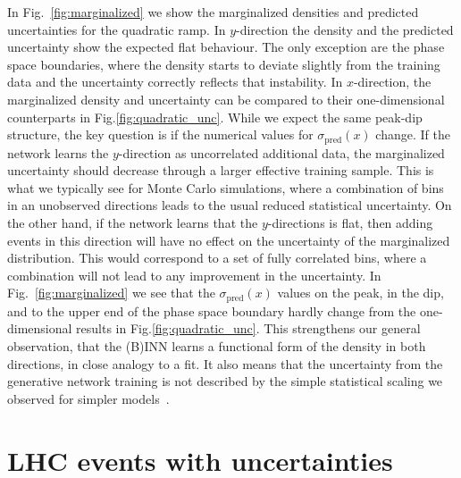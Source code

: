 In Fig.~\ref{fig:marginalized} we show the marginalized densities and
predicted uncertainties for the quadratic ramp.  In $y$-direction the
density and the predicted uncertainty show the expected flat
behaviour. The only exception are the phase space boundaries, where the
density starts to deviate slightly from the training data and the
uncertainty correctly reflects that instability.  In $x$-direction,
the marginalized density and uncertainty can be compared to their
one-dimensional counterparts in Fig.\ref{fig:quadratic_unc}. While we
expect the same peak-dip structure, the key question is if the
numerical values for $\sigma_\text{pred}(x)$ change. If the network
learns the $y$-direction as uncorrelated additional data, the
marginalized uncertainty should decrease through a larger effective
training sample. This is what we typically see for Monte Carlo
simulations, where a combination of bins in an unobserved directions
leads to the usual reduced statistical uncertainty. On the other hand,
if the network learns that the $y$-directions is flat, then adding
events in this direction will have no effect on the uncertainty of the
marginalized distribution. This would correspond to a set of fully
correlated bins, where a combination will not lead to any improvement
in the uncertainty. In Fig.~\ref{fig:marginalized} we see that the
$\sigma_\text{pred}(x)$ values on the peak, in the dip, and to the
upper end of the phase space boundary hardly change from the
one-dimensional results in Fig.\ref{fig:quadratic_unc}. This strengthens
our general observation, that the (B)INN learns a functional form of
the density in both directions, in close analogy to a fit. It also
means that the uncertainty from the generative network training is not
described by the simple statistical scaling we observed for simpler
models~\cite{Bollweg:2019skg,Kasieczka:2020vlh}.

\section{LHC events with uncertainties}
\label{sec:lhc}

